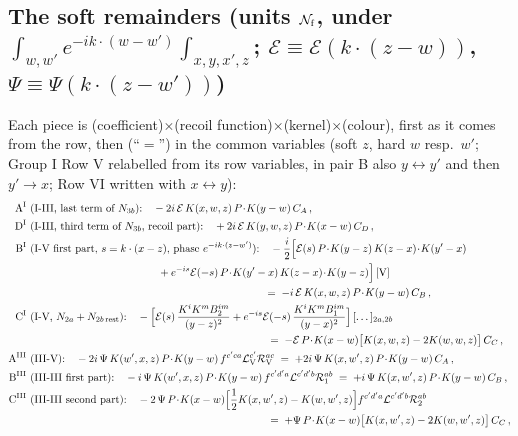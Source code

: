 \documentclass[9pt]{article}
\numberwithin{equation}{section}
\begin{document}
{\subsection*{The soft remainders (units $\mathcal{N}_{\rm f}$, under $\int_{w,w'}e^{-ik\cdot(w-w')}\int_{x,y,x',z}$; $\mathcal{E}\equiv\mathcal{E}(k\cdot(z-w))$, $\Psi\equiv\Psi(k\cdot(z-w'))$)}
\noindent Each piece is (coefficient)$\times$(recoil function)$\times$(kernel)$\times$(colour), first as it comes from the row, then (``$=$'') in the common variables (soft $z$, hard $w$ resp.\ $w'$; Group I Row V relabelled from its row variables, in pair B also $y\leftrightarrow y'$ and then $y'\to x$; Row VI written with $x\leftrightarrow y$):
\begin{align}
\text{A}^{\rm I}\ &\text{(I-III, last term of $N_{3b}$):}\quad -2i\,\mathcal{E}\,K(x,w,z)\,P\!\cdot\!K(y-w)\,C_{A}\,,\notag\\
\text{D}^{\rm I}\ &\text{(I-III, third term of $N_{3b}$, recoil part):}\quad +2i\,\mathcal{E}\,K(y,w,z)\,P\!\cdot\!K(x-w)\,C_{D}\,,\notag\\
\text{B}^{\rm I}\ &\text{(I-V first part, $s=k\cdot(x-z)$, phase $e^{-ik\cdot(z-w')}$):}\quad-\frac{i}{2}\Big[\mathcal{E}(s)\,P\!\cdot\!K(y-z)\,K(z-x)\!\cdot\!K(y'-x)\notag\\&\hspace{12em}+e^{-is}\mathcal{E}(-s)\,P\!\cdot\!K(y'-x)\,K(z-x)\!\cdot\!K(y-z)\Big]\,[\text{V}]\notag\\
&\hspace{22em}=\;-i\,\mathcal{E}\,K(x,w,z)\,P\!\cdot\!K(y-w)\,C_{B}\,,\notag\\
\text{C}^{\rm I}\ &\text{(I-V, $N_{2a}+N_{2b\,\rm rest}$):}\quad-\Big[\mathcal{E}(s)\,\frac{K^{i}K^{m}B_{2}^{im}}{(y-z)^{2}}+e^{-is}\mathcal{E}(-s)\,\frac{K^{i}K^{m}B_{1}^{im}}{(y-x)^{2}}\Big]\,[\dots]_{2a,2b}\notag\\&\hspace{22em}\;=\;-\mathcal{E}\,P\!\cdot\!K(x-w)\big[K(x,w,z)-2K(w,w,z)\big]\,C_{C}\,,\notag\\
\text{A}^{\rm III}\ &\text{(III-V):}\quad-2i\,\Psi\,K(w',x,z)\,P\!\cdot\!K(y-w)\,f^{c'ca}\mathcal{L}_{\rm V}^{c'}\mathcal{R}_{\rm V}^{ac}\;=\;+2i\,\Psi\,K(x,w',z)\,P\!\cdot\!K(y-w)\,C_{A}\,,\label{eq:fx-pieces}\\
\text{B}^{\rm III}\ &\text{(III-III first part):}\quad-i\,\Psi\,K(w',x,z)\,P\!\cdot\!K(y-w)\,f^{c'd'a}\mathcal{L}^{c'd'b}\mathcal{R}_{1}^{ab}\;=\;+i\,\Psi\,K(x,w',z)\,P\!\cdot\!K(y-w)\,C_{B}\,,\notag\\
\text{C}^{\rm III}\ &\text{(III-III second part):}\quad-2\,\Psi\,P\!\cdot\!K(x-w)\Big[\frac12K(x,w',z)-K(w,w',z)\Big]f^{c'd'a}\mathcal{L}^{c'd'b}\mathcal{R}_{2}^{ab}\notag\\&\hspace{22em}\;=\;+\Psi\,P\!\cdot\!K(x-w)\big[K(x,w',z)-2K(w,w',z)\big]\,C_{C}\,,\notag\\

\end{align}}
\end{document}
